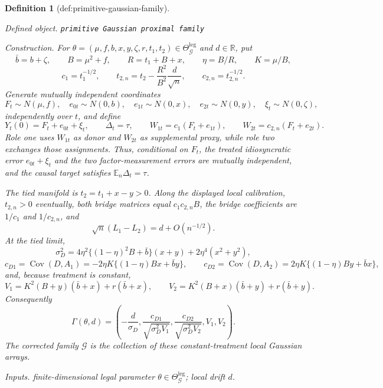 \documentclass{article}
\newtheorem{definition}{Definition}
\begin{document}
\begin{definition}[def:primitive-gaussian-family]\label{def:primitive-gaussian-family}
\par\smallskip\noindent\emph{Defined object.} \texttt{primitive Gaussian proximal family}
\par\smallskip\noindent\emph{Construction.} For \(\theta=(\mu,f,b,x,y,\zeta,r,t_1,t_2)\in\Theta_{\mathcal G}^{\mathrm{leg}}\) and \(d\in\mathbb R\), put
\[
 \bar b=b+\zeta,\qquad B=\mu^2+f,\qquad
 R=t_1+B+x,\qquad \eta=B/R,\qquad K=\mu/B,
\]
\[
 c_1=t_1^{-1/2},\qquad
 t_{2,n}=t_2-\frac{R^2}{B^2}\frac d{\sqrt n},
 \qquad c_{2,n}=t_{2,n}^{-1/2}.
\]
Generate mutually independent coordinates
\[
 F_t\sim N(\mu,f),\quad e_{0t}\sim N(0,b),\quad
 e_{1t}\sim N(0,x),\quad e_{2t}\sim N(0,y),\quad
 \xi_t\sim N(0,\zeta),
\]
independently over \(t\), and define
\[
 Y_t(0)=F_t+e_{0t}+\xi_t,\qquad
 \Delta_t=\tau,\qquad
 W_{1t}=c_1(F_t+e_{1t}),\qquad
 W_{2t}=c_{2,n}(F_t+e_{2t}).
\]
Role one uses \(W_{1t}\) as donor and \(W_{2t}\) as supplemental proxy, while role two exchanges those assignments.  Thus, conditional on \(F_t\), the treated idiosyncratic error \(e_{0t}+\xi_t\) and the two factor-measurement errors are mutually independent, and the causal target satisfies \(\mathbb E_n\Delta_t=\tau\).

The tied manifold is \(t_2=t_1+x-y>0\).  Along the displayed local calibration, \(t_{2,n}>0\) eventually, both bridge matrices equal \(c_1c_{2,n}B\), the bridge coefficients are \(1/c_1\) and \(1/c_{2,n}\), and
\[
 \sqrt n(L_1-L_2)=d+O(n^{-1/2}).
\]
At the tied limit,
\[
 \sigma_D^2
 =4\eta^2\{(1-\eta)^2B+\bar b\}(x+y)
  +2\eta^4(x^2+y^2),
\]
\[
 c_{D1}=\operatorname{Cov}(D,A_1)
 =-2\eta K\{(1-\eta)Bx+\bar b y\},
\qquad
 c_{D2}=\operatorname{Cov}(D,A_2)
 =2\eta K\{(1-\eta)By+\bar b x\},
\]
and, because treatment is constant,
\[
 V_1=K^2(B+y)(\bar b+x)+r(\bar b+x),
\qquad
 V_2=K^2(B+x)(\bar b+y)+r(\bar b+y).
\]
Consequently
\[
 \Gamma(\theta,d)
 =\left(
 -\frac d{\sigma_D},
 \frac{c_{D1}}{\sqrt{\sigma_D^2V_1}},
 \frac{c_{D2}}{\sqrt{\sigma_D^2V_2}},
 V_1,V_2
 \right).
\]
The corrected family \(\mathcal G\) is the collection of these constant-treatment local Gaussian arrays.
\par\smallskip\noindent\emph{Inputs.} finite-dimensional legal parameter \(\theta\in\Theta_{\mathcal G}^{\mathrm{leg}}\); local drift \(d\).
\end{definition}
\end{document}

